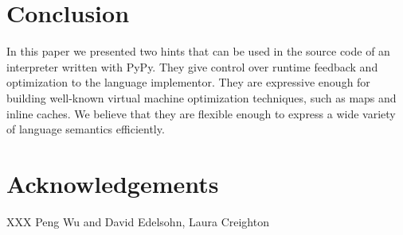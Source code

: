 \documentclass{sigplanconf}
\begin{document}



\section{Conclusion}

In this paper we presented two hints that can be used in the source code of an
interpreter written with PyPy. They give control over runtime feedback and
optimization to the language implementor. They are expressive enough for
building well-known virtual machine optimization techniques, such as maps and
inline caches. We believe that they are flexible enough to express a wide
variety of language semantics efficiently.


\section*{Acknowledgements}

XXX Peng Wu and David Edelsohn, Laura Creighton



\end{document}
